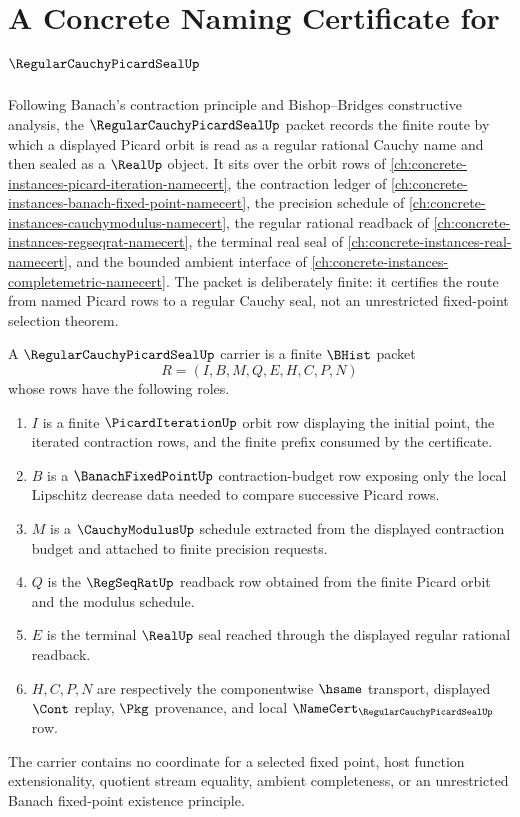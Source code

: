 \chapter{A Concrete Naming Certificate for $\RegularCauchyPicardSealUp$}
\label{ch:concrete-instances-regular-cauchy-picard-seal-namecert}

Following Banach's contraction principle and Bishop--Bridges constructive analysis, the $\RegularCauchyPicardSealUp$ packet records the finite route by which a displayed Picard orbit is read as a regular rational Cauchy name and then sealed as a $\RealUp$ object. It sits over the orbit rows of \autoref{ch:concrete-instances-picard-iteration-namecert}, the contraction ledger of \autoref{ch:concrete-instances-banach-fixed-point-namecert}, the precision schedule of \autoref{ch:concrete-instances-cauchymodulus-namecert}, the regular rational readback of \autoref{ch:concrete-instances-regseqrat-namecert}, the terminal real seal of \autoref{ch:concrete-instances-real-namecert}, and the bounded ambient interface of \autoref{ch:concrete-instances-completemetric-namecert}. The packet is deliberately finite: it certifies the route from named Picard rows to a regular Cauchy seal, not an unrestricted fixed-point selection theorem.

\begin{definition}
\label{def:regular-cauchy-picard-seal-carrier}
A $\RegularCauchyPicardSealUp$ carrier is a finite $\BHist$ packet
$$
R=(I,B,M,Q,E,H,C,P,N)
$$
whose rows have the following roles.
\begin{enumerate}
\item $I$ is a finite $\PicardIterationUp$ orbit row displaying the initial point, the iterated contraction rows, and the finite prefix consumed by the certificate.
\item $B$ is a $\BanachFixedPointUp$ contraction-budget row exposing only the local Lipschitz decrease data needed to compare successive Picard rows.
\item $M$ is a $\CauchyModulusUp$ schedule extracted from the displayed contraction budget and attached to finite precision requests.
\item $Q$ is the $\RegSeqRatUp$ readback row obtained from the finite Picard orbit and the modulus schedule.
\item $E$ is the terminal $\RealUp$ seal reached through the displayed regular rational readback.
\item $H,C,P,N$ are respectively the componentwise $\hsame$ transport, displayed $\Cont$ replay, $\Pkg$ provenance, and local $\NameCert_{\RegularCauchyPicardSealUp}$ row.
\end{enumerate}
The carrier contains no coordinate for a selected fixed point, host function extensionality, quotient stream equality, ambient completeness, or an unrestricted Banach fixed-point existence principle.
\end{definition}

